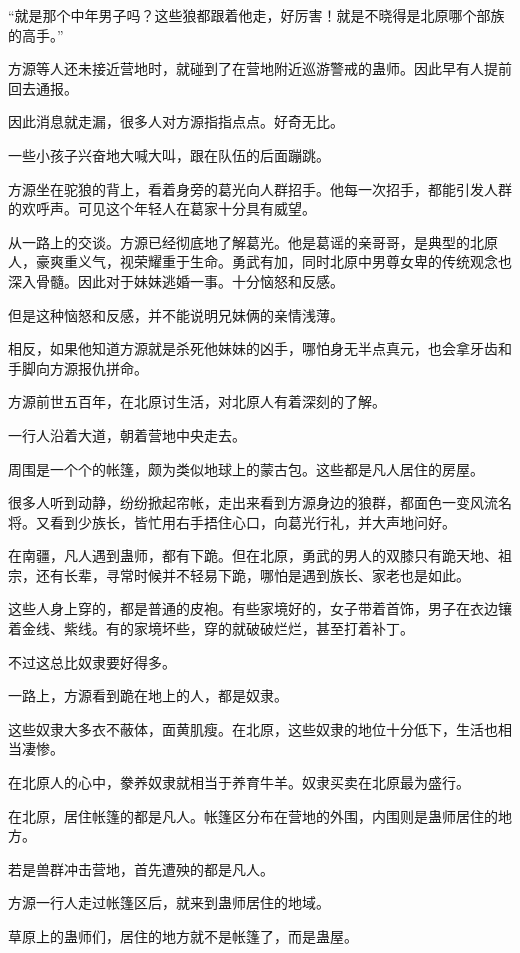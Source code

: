 \begin{this_body}
“就是那个中年男子吗？这些狼都跟着他走，好厉害！就是不晓得是北原哪个部族的高手。”

方源等人还未接近营地时，就碰到了在营地附近巡游警戒的蛊师。因此早有人提前回去通报。

因此消息就走漏，很多人对方源指指点点。好奇无比。

一些小孩子兴奋地大喊大叫，跟在队伍的后面蹦跳。

方源坐在驼狼的背上，看着身旁的葛光向人群招手。他每一次招手，都能引发人群的欢呼声。可见这个年轻人在葛家十分具有威望。

从一路上的交谈。方源已经彻底地了解葛光。他是葛谣的亲哥哥，是典型的北原人，豪爽重义气，视荣耀重于生命。勇武有加，同时北原中男尊女卑的传统观念也深入骨髓。因此对于妹妹逃婚一事。十分恼怒和反感。

但是这种恼怒和反感，并不能说明兄妹俩的亲情浅薄。

相反，如果他知道方源就是杀死他妹妹的凶手，哪怕身无半点真元，也会拿牙齿和手脚向方源报仇拼命。

方源前世五百年，在北原讨生活，对北原人有着深刻的了解。

一行人沿着大道，朝着营地中央走去。

周围是一个个的帐篷，颇为类似地球上的蒙古包。这些都是凡人居住的房屋。

很多人听到动静，纷纷掀起帘帐，走出来看到方源身边的狼群，都面色一变风流名将。又看到少族长，皆忙用右手捂住心口，向葛光行礼，并大声地问好。

在南疆，凡人遇到蛊师，都有下跪。但在北原，勇武的男人的双膝只有跪天地、祖宗，还有长辈，寻常时候并不轻易下跪，哪怕是遇到族长、家老也是如此。

这些人身上穿的，都是普通的皮袍。有些家境好的，女子带着首饰，男子在衣边镶着金线、紫线。有的家境坏些，穿的就破破烂烂，甚至打着补丁。

不过这总比奴隶要好得多。

一路上，方源看到跪在地上的人，都是奴隶。

这些奴隶大多衣不蔽体，面黄肌瘦。在北原，这些奴隶的地位十分低下，生活也相当凄惨。

在北原人的心中，豢养奴隶就相当于养育牛羊。奴隶买卖在北原最为盛行。

在北原，居住帐篷的都是凡人。帐篷区分布在营地的外围，内围则是蛊师居住的地方。

若是兽群冲击营地，首先遭殃的都是凡人。

方源一行人走过帐篷区后，就来到蛊师居住的地域。

草原上的蛊师们，居住的地方就不是帐篷了，而是蛊屋。


\end{this_body}
